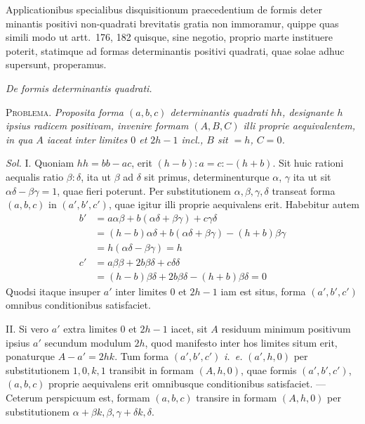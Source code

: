 Applicationibus specialibus disquisitionum praecedentium de formis deter%
%
minantis positivi non-quadrati brevitatis gratia non immoramur, quippe quas simili modo ut artt.~176, 182 quisque, sine negotio, proprio marte instituere poterit, statimque ad formas determinantis positivi quadrati, quae solae adhuc supersunt, properamus.

\begin{center}
\textit{De formis determinantis quadrati.}
\end{center}

\textsc{Problema.} \textit{Proposita forma $(a,b,c)$ determinantis quadrati $hh$, designante $h$ ipsius radicem positivam, invenire formam $(A,B,C)$ illi proprie aequivalentem, in qua $A$ iaceat inter limites $0$ et $2h-1$ incl., $B$ sit $=h$, $C=0$.}

\textit{Sol.} I. Quoniam $hh=bb-ac$, erit $(h-b):a=c:-(h+b)$. Sit huic rationi aequalis ratio $\beta:\delta$, ita ut $\beta$ ad $\delta$ sit primus, determinenturque $\alpha$, $\gamma$ ita ut sit $\alpha\delta-\beta\gamma=1$, quae fieri poterunt. Per substitutionem $\alpha,\beta,\gamma,\delta$ transeat forma $(a,b,c)$ in $(a',b',c')$, quae igitur illi proprie aequivalens erit. Habebitur autem
\[
\begin{aligned}
b'&=a\alpha\beta+b(\alpha\delta+\beta\gamma)+c\gamma\delta\\
&=(h-b)\alpha\delta+b(\alpha\delta+\beta\gamma)-(h+b)\beta\gamma\\
&=h(\alpha\delta-\beta\gamma)=h\\
c'&=a\beta\beta+2b\beta\delta+c\delta\delta\\
&=(h-b)\beta\delta+2b\beta\delta-(h+b)\beta\delta=0
\end{aligned}
\]
Quodsi itaque insuper $a'$ inter limites $0$ et $2h-1$ iam est situs, forma $(a',b',c')$ omnibus conditionibus satisfaciet.

II. Si vero $a'$ extra limites $0$ et $2h-1$ iacet, sit $A$ residuum minimum positivum ipsius $a'$ secundum modulum $2h$, quod manifesto inter hos limites situm erit, ponaturque $A-a'=2hk$. Tum forma $(a',b',c')$ \textit{i.~e.} $(a',h,0)$ per substitutionem $1,0,k,1$ transibit in formam $(A,h,0)$, quae formis $(a',b',c')$, $(a,b,c)$ proprie aequivalens erit omnibusque conditionibus satisfaciet. --- Ceterum perspicuum est, formam $(a,b,c)$ transire in formam $(A,h,0)$ per substitutionem $\alpha+\beta k,\beta,\gamma+\delta k,\delta$.

